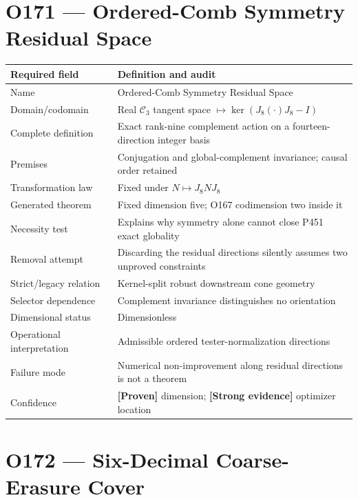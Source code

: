 \documentclass[11pt,a4paper,openany]{report}
\newcommand{\statusProven}{\textcolor{fingreen}{[Proven]}}
\newcommand{\statusStrong}{\textcolor{finblue}{[Strong evidence]}}
\begin{document}
\section{O171 --- Ordered-Comb Symmetry Residual Space}

\begin{center}
\begingroup\small
\setlength{\tabcolsep}{2.5pt}
\renewcommand{\arraystretch}{1.16}
\begin{longtable}{@{}p{}p{}@{}}
\toprule
\textbf{Required field} & \textbf{Definition and audit} \\
\midrule
\endhead
Name & Ordered-Comb Symmetry Residual Space \\
Domain/\allowbreak{}codomain & Real \(\mathcal C_3\) tangent space \(\mapsto\ker(J_8(\cdot)J_8-I)\) \\
Complete definition & Exact rank-nine complement action on a fourteen-direction integer basis \\
Premises & Conjugation and global-complement invariance; causal order retained \\
Transformation law & Fixed under \(N\mapsto J_8NJ_8\) \\
Generated theorem & Fixed dimension five; O167 codimension two inside it \\
Necessity test & Explains why symmetry alone cannot close P451 exact globality \\
Removal attempt & Discarding the residual directions silently assumes two unproved constraints \\
Strict/\allowbreak{}legacy relation & Kernel-split robust downstream cone geometry \\
Selector dependence & Complement invariance distinguishes no orientation \\
Dimensional status & Dimensionless \\
Operational interpretation & Admissible ordered tester-normalization directions \\
Failure mode & Numerical non-improvement along residual directions is not a theorem \\
Confidence & \textbf{\statusProven{}} dimension; \textbf{\statusStrong{}} optimizer location \\
\bottomrule
\end{longtable}
\endgroup
\end{center}

\section{O172 --- Six-Decimal Coarse-Erasure Cover}
\end{document}
